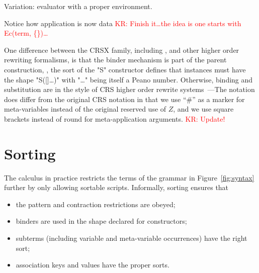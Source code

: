 \documentclass[letterpaper,11pt]{article}
\newcommand{\KR}[1]{\textcolor{red}{KR: #1}}
\begin{document}
\begin{example}
  Variation: evaluator with a proper environment. 
  Notice how application is now data
  \KR{Finish it…the idea is one starts with Ec(term, \{\})…}
\end{example}

\begin{remark}
  One difference between the CRSX family, including \hax, and other higher order rewriting
  formalisms, is that the binder mechanism is part of the parent construction, \eg, the sort of the
  "S" constructor defines that instances must have the shape "S([]…)" with "…" being itself a Peano
  number.  Otherwise, binding and substitution are in the style of CRS higher order rewrite
  systems~\cite{Klop+:tcs1993}---The notation does differ from the original CRS notation in that we
  use ``\#'' as a marker for meta-variables instead of the original reserved use of $Z$, and we use
  square brackets instead of round for meta-application arguments. \KR{Update!}
\end{remark}



\section{Sorting}
\label{sec:sorting}

The \hax calculus in practice restricts the terms of the grammar in Figure~\ref{fig:syntax} further
by only allowing sortable scripts. Informally, sorting ensures that
\begin{itemize}
\item the pattern and contraction restrictions are obeyed;
\item binders are used in the shape declared for constructors;
\item subterms (including variable and meta-variable occurrences) have the right sort;
\item association keys and values have the proper sorts.
\end{itemize}
\end{document}
